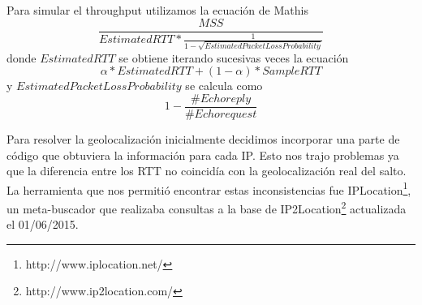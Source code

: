 Para simular el throughput utilizamos la ecuación de Mathis
$$\frac{MSS}{EstimatedRTT * \frac{1}{1 - \sqrt{EstimatedPacketLossProbability}}}$$
donde $EstimatedRTT$ se obtiene iterando sucesivas veces la ecuación
$$\alpha * EstimatedRTT + (1 - \alpha) * SampleRTT$$
y $EstimatedPacketLossProbability$ se calcula como $$1 - \frac{\#Echo reply}{\#Echo request}$$


Para resolver la geolocalización inicialmente decidimos incorporar una parte de código que obtuviera la información para cada IP. Esto nos trajo problemas ya que la diferencia entre los RTT no coincidía con la geolocalización real del salto. La herramienta que nos permitió encontrar estas inconsistencias fue IPLocation\footnote{http://www.iplocation.net/}, un meta-buscador que realizaba consultas a la base de IP2Location\footnote{http://www.ip2location.com/} actualizada el 01/06/2015. 